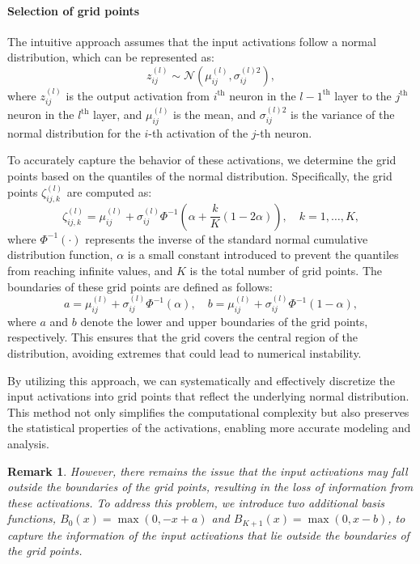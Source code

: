 \documentclass[11pt]{scrartcl}
\newtheorem{remark}{Remark}
\begin{document}
\paragraph*{Selection of grid points}

The intuitive approach assumes that the input activations follow a normal distribution, which can be represented as:
\begin{equation}
	z_{ij}^{(l)} \sim \mathcal{N}\left(\mu_{ij}^{(l)}, \sigma_{ij}^{(l)2}\right),
\end{equation}
where $z_{ij}^{(l)}$ is the output activation from $i^{\text{th}}$ neuron in the $l-1^{\text{th}}$ layer to the $j^{\text{th}}$ neuron in the $l^{\text{th}}$ layer, and $\mu_{ij}^{(l)}$ is the mean, and $\sigma_{ij}^{(l)2}$ is the variance of the normal distribution for the $i$-th activation of the $j$-th neuron.

To accurately capture the behavior of these activations, we determine the grid points based on the quantiles of the normal distribution. Specifically, the grid points $\zeta_{ij,k}^{(l)}$ are computed as:
\begin{equation}
	\zeta_{ij,k}^{(l)}=\mu_{ij}^{(l)}+\sigma_{ij}^{(l)}\Phi^{-1}\left(\alpha+\frac{k}{K}(1-2\alpha)\right),\quad k=1,\ldots,K,
\end{equation}
where $\Phi^{-1}(\cdot)$ represents the inverse of the standard normal cumulative distribution function, $\alpha$ is a small constant introduced to prevent the quantiles from reaching infinite values, and $K$ is the total number of grid points. The boundaries of these grid points are defined as follows:
\begin{equation}
	a=\mu_{ij}^{(l)}+\sigma_{ij}^{(l)}\Phi^{-1}(\alpha),\quad b=\mu_{ij}^{(l)}+\sigma_{ij}^{(l)}\Phi^{-1}(1-\alpha),
\end{equation}
where $a$ and $b$ denote the lower and upper boundaries of the grid points, respectively. This ensures that the grid covers the central region of the distribution, avoiding extremes that could lead to numerical instability.

By utilizing this approach, we can systematically and effectively discretize the input activations into grid points that reflect the underlying normal distribution. This method not only simplifies the computational complexity but also preserves the statistical properties of the activations, enabling more accurate modeling and analysis.

\begin{remark}
	However, there remains the issue that the input activations may fall outside the boundaries of the grid points, resulting in the loss of information from these activations. To address this problem, we introduce two additional basis functions, $B_{0}(x) = \max(0, -x + a)$ and $B_{K+1}(x) = \max(0, x - b)$, to capture the information of the input activations that lie outside the boundaries of the grid points.
\end{remark}
\end{document}
